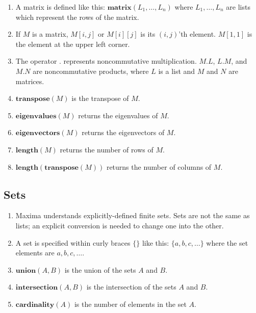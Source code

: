 \documentclass[12pt]{article}
\begin{document}
\begin{enumerate}

\item A matrix is defined like this: $\mathbf{matrix}(L_1, \ldots, L_n)$
    where $L_1, \ldots, L_n$ are lists which represent the rows of the matrix.
    
\item If $M$ is a matrix, $M[i, j]$ or $M[i][j]$ is its $(i, j)$'th element.
    $M[1,1]$ is the element at the upper left corner.

\item The operator $\mathbf{.}$ represents noncommutative multiplication.
    $M . L$, $L . M$, and $M . N$ are noncommutative products,
    where $L$ is a list and $M$ and $N$ are matrices.


\item $\mathbf{transpose}(M)$ is the transpose of $M$.

\item $\mathbf{eigenvalues}(M)$ returns the eigenvalues of $M$.

\item $\mathbf{eigenvectors}(M)$ returns the eigenvectors of $M$.

\item $\mathbf{length}(M)$ returns the number of rows of $M$.

\item $\mathbf{length}(\mathbf{transpose}(M))$ returns the number of columns of $M$.

\end{enumerate}

\subsection{Sets}

\begin{enumerate}

\item Maxima understands explicitly-defined finite sets.
    Sets are not the same as lists; an explicit conversion is needed to change one into the other.
    
\item A set is specified within curly braces $\{ \}$ like this:
    $\{a, b, c, \ldots\}$ where the set elements are $a, b, c, \ldots$.

\item $\mathbf{union} (A, B)$ is the union of the sets $A$ and $B$.

\item $\mathbf{intersection} (A, B)$ is the intersection of the sets $A$ and $B$.

\item $\mathbf{cardinality} (A)$ is the number of elements in the set $A$.

\end{enumerate}
\end{document}
